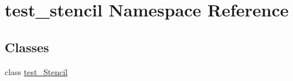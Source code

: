\hypertarget{namespacetest__stencil}{}\section{test\+\_\+stencil Namespace Reference}
\label{namespacetest__stencil}
\subsection*{Classes}
\begin{DoxyCompactItemize}
\item 
class \hyperlink{classtest__stencil_1_1test__Stencil}{test\+\_\+\+Stencil}
\end{DoxyCompactItemize}
